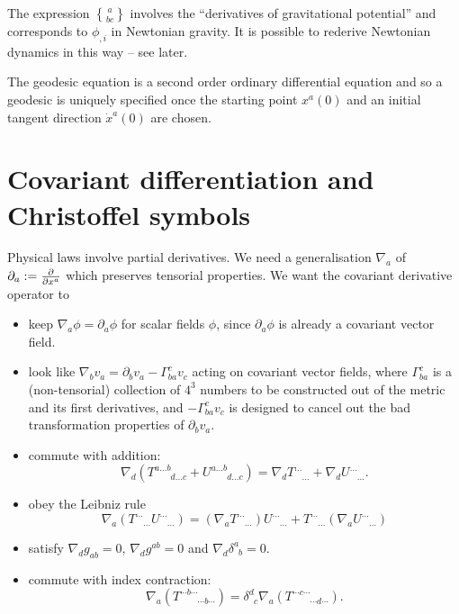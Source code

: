 \documentclass{notes}
\newcommand{\ch}[2]{\genfrac{\{}{\}}{0pt}{}{#1}{#2}}
\newcommand{\del}{\nabla}
\begin{document}
The expression $\ch{a}{b c}$ involves the ``derivatives of
gravitational potential'' and corresponds to $\phi_{,i}$ in Newtonian
gravity.  It is possible to rederive Newtonian dynamics in this way --
see later.

The geodesic equation is a second order ordinary differential equation
and so a geodesic is uniquely specified once the starting point
$x^a(0)$ and an initial tangent direction $\dot x^a(0)$ are
chosen.

\section{Covariant differentiation and Christoffel symbols}

Physical laws involve partial derivatives. We need a generalisation
$\del_a$ of $\partial_a := \frac{\partial }{\partial x^a}$ which preserves tensorial
properties.  We want the covariant derivative operator to

\begin{itemize}
\item keep $\del_a \phi=\partial_a \phi$ for scalar
fields $\phi$, since $\partial_a \phi$ is already a 
covariant vector field.

\item look like $\del_b v_a = \partial_b v_a -
  \Gamma^c_{b a} v_c$ acting on covariant vector fields,
  where $\Gamma^c_{b a}$ is a (non-tensorial) collection of
  $4^3$ numbers to be constructed out of the metric and its first
  derivatives, and $-\Gamma^c_{b a} v_c$ is designed to
  cancel out the bad transformation properties of $\partial_b v_a$.

\item commute with addition:
\[
\del_d ( T^{a \dots b}_{\phantom{a \dots b}
d \dots c} +
U^{a \dots b}_{\phantom{a \dots b} d \dots c} ) =
\del_d T^{\dots}_{\phantom{\dots}\dots} + \del_d U^{\dots}_{
\phantom{\dots}\dots}.
\]

\item obey the Leibniz rule
\[
\del_a \left( T^{\dots}_{\phantom{\dots}\dots}
  U^{\dots}_{\phantom{\dots}\dots} \right) = \left(\del_a
  T^{\dots}_{\phantom{\dots}\dots}\right)
U^{\dots}_{\phantom{\dots}\dots} + T^{\dots}_{\phantom{\dots}\dots}
\left(\del_a U^{\dots}_{\phantom{\dots}\dots}\right)
\]

\item satisfy $\nabla_d g_{a b} = 0$, $\nabla_d g^{a b}
  = 0$ and $\nabla_d \delta^a_{\phantom{a}b} = 0$.

\item commute with index contraction:
\[
\del_a \left( T^{\cdots b \cdots}_{\phantom{\cdots b \cdots}\cdots
    b \cdots}\right) = \delta^d_{\phantom{d} c} \del_a \left(
T^{\cdots c \cdots}_{\phantom{\cdots c \cdots}\cdots
    d \cdots}
\right).
\]
\end{itemize}
\end{document}
